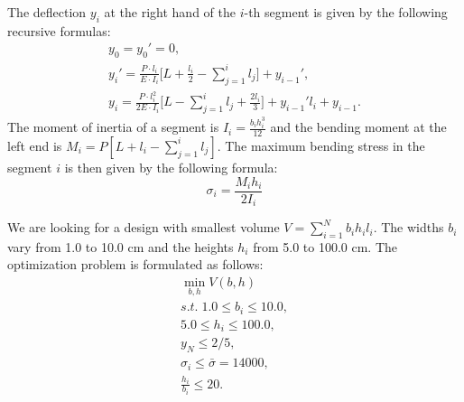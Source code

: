 \documentclass[runningheads,a4paper]{llncs}
\begin{document}
The deflection $y_i$ at the right hand of the $i$-th segment is given by the following recursive formulas:
\begin{displaymath}
  \begin{array}{c}
    y_0=y_0'=0, \\
    y_i'=\frac{P\cdot l_i}{E\cdot I_i}\Big[ L+\frac{l_i}{2}-\sum\limits_{j=1}^i l_j\Big]+y_{i-1}', \\
    y_i=\frac{P\cdot l_i^2}{2E\cdot I_i}\Big[L-\sum\limits_{j=1}^i l_j + \frac{2l_i}{3}\Big]+y_{i-1}'l_i+y_{i-1}.
  \end{array}
\end{displaymath}
The moment of inertia of a segment is $I_i=\frac{b_i h_i^3}{12}$ and the bending moment at the left end is $M_i=P[L+l_i- \sum_{j=1}^{i}  l_j ]$. The maximum bending stress in the segment $i$ is then given by the following formula:
\begin{displaymath}
  \sigma_i=\frac{M_i h_i}{2I_i}
\end{displaymath}

We are looking for a design with smallest volume $V = \sum_{i=1}^N b_i h_i l_i$. The widths $b_i$ vary from 1.0 to 10.0 cm and the heights $h_i$ from 5.0 to 100.0 cm. The optimization problem is formulated as follows:
\begin{displaymath}
  \begin{array}{c}
    \min\limits_{ b,  h}V( b,  h) \\
    s.t.\;1.0\le b_i \le 10.0, \\
    5.0 \le h_i \le 100.0, \\
    y_N\le 2/5, \\
    \sigma_i \le \bar{\sigma}=14000, \\
    \frac{h_i}{b_i}\le 20.
  \end{array}
\end{displaymath}
\end{document}

